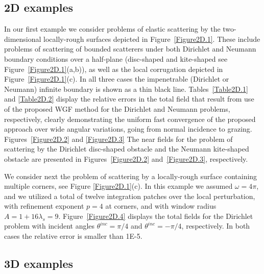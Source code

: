 \documentclass[10pt]{article}
\numberwithin{equation}{section}
\begin{document}
\subsection{2D examples}
In our first example we consider problems of elastic scattering by the
two-dimensional locally-rough surfaces depicted in
Figure~\ref{Figure2D.1}. These include problems of scattering of
bounded scatterers under both Dirichlet and Neumann boundary
conditions over a half-plane (disc-shaped and kite-shaped see
Figure~\ref{Figure2D.1}(a,b)), as well as the local corrugation
depicted in Figure~\ref{Figure2D.1}(c).  In all three cases the
impenetrable (Dirichlet or Neumann) infinite boundary is shown as a
thin black line. Tables~\ref{Table2D.1} and \ref{Table2D.2} display
the relative errors in the total field that result from use of the
proposed WGF method for the Dirichlet and Neumann problems,
respectively, clearly demonstrating the uniform fast convergence of
the proposed approach over wide angular variations, going from normal
incidence to grazing. Figures~\ref{Figure2D.2} and \ref{Figure2D.3}
The near fields for the problem of scattering by the Dirichlet
disc-shaped obstacle and the Neumann kite-shaped obstacle are
presented in Figures~\ref{Figure2D.2} and~\ref{Figure2D.3}, respectively.




We consider next the problem of scattering by a locally-rough surface
containing multiple corners, see Figure \ref{Figure2D.1}(c). In this
example we assumed $\omega=4\pi$, and we utilized a total of twelve
integration patches over the local perturbation, with refinement
exponent $p=4$ at corners, and with window radius
$A=1+16\lambda_s= 9$. Figure~\ref{Figure2D.4} displays the total
fields for the Dirichlet problem with incident angles
$\theta^{inc}=\pi/4$ and $\theta^{inc}=-\pi/4$, respectively. In both
cases the relative error is smaller than 1E-5.

\subsection{3D examples}
\end{document}
